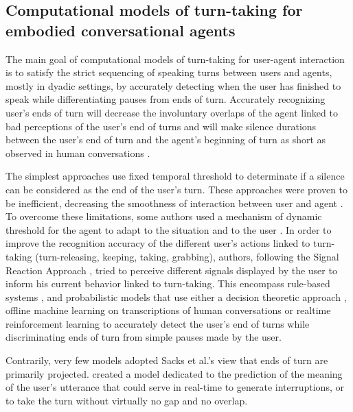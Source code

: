 \subsection{Computational models of turn-taking for embodied conversational agents}
\label{comp_modelling}

The main goal of computational models of turn-taking for user-agent interaction is to satisfy the strict sequencing of speaking turns between users and agents, mostly in
dyadic settings, by accurately detecting when the user has finished to speak while differentiating pauses from ends of turn. Accurately recognizing user's ends of turn
will decrease the involuntary overlaps of the agent linked to bad perceptions of the user's end of turns and will make silence durations between the user's end of turn and the agent's beginning of turn as short as observed
in human conversations \citep{balentine_debouncing_1997,ward_root_2005,raux_optimizing_2012,
jonsdottir_distributed_2013}.

The simplest approaches use fixed temporal threshold to determinate if a silence can be considered as the end of the user's turn. These approaches were proven to be inefficient, decreasing the
smoothness of interaction between user and agent \citep{ward_root_2005}. To
overcome these limitations, some authors used a mechanism
of dynamic threshold for the agent to adapt to the
situation and to the user \citep{bohus_decisions_2011,witt_modeling_2014}. In order to improve the recognition accuracy of the different user's actions linked to turn-taking (turn-releasing, keeping, taking, grabbing), authors, following the Signal Reaction Approach \citep{duncan_signals_1972}, tried to perceive different signals displayed by the user to inform his current behavior linked to turn-taking.   
This encompass rule-based systems \citep{cassell_embodiment_1999,thorisson_natural_2002}, and probabilistic
models that use either a decision theoretic approach \citep{bohus_decisions_2011,raux_optimizing_2012}, offline machine learning on transcriptions of human conversations \citep{schlangen_reaction_2006,huang_multimodal_2011} or realtime reinforcement learning \citep{jonsdottir_distributed_2013} to accurately detect the user's end of turns while discriminating ends of turn from simple pauses made by the user. 

Contrarily, very few models adopted Sacks et al.'s view that ends of turn are primarily projected. \citep{de_vault_incremental_2011} created a model dedicated to the prediction of the meaning of the user's utterance that could serve in real-time to generate interruptions, or to take the turn without virtually no gap and no overlap.

